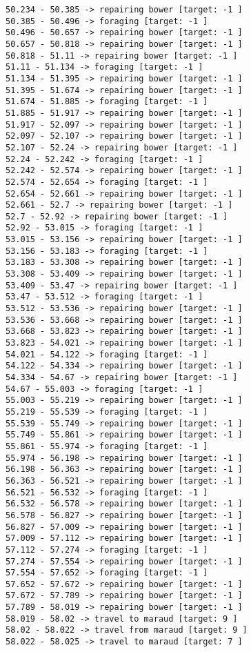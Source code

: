 \documentclass[11pt]{article}
\begin{document}
\begin{Verbatim}[commandchars=\\\{\}]
50.234 - 50.385 -> repairing bower [target: -1 ]
50.385 - 50.496 -> foraging [target: -1 ]
50.496 - 50.657 -> repairing bower [target: -1 ]
50.657 - 50.818 -> repairing bower [target: -1 ]
50.818 - 51.11 -> repairing bower [target: -1 ]
51.11 - 51.134 -> foraging [target: -1 ]
51.134 - 51.395 -> repairing bower [target: -1 ]
51.395 - 51.674 -> repairing bower [target: -1 ]
51.674 - 51.885 -> foraging [target: -1 ]
51.885 - 51.917 -> repairing bower [target: -1 ]
51.917 - 52.097 -> repairing bower [target: -1 ]
52.097 - 52.107 -> repairing bower [target: -1 ]
52.107 - 52.24 -> repairing bower [target: -1 ]
52.24 - 52.242 -> foraging [target: -1 ]
52.242 - 52.574 -> repairing bower [target: -1 ]
52.574 - 52.654 -> foraging [target: -1 ]
52.654 - 52.661 -> repairing bower [target: -1 ]
52.661 - 52.7 -> repairing bower [target: -1 ]
52.7 - 52.92 -> repairing bower [target: -1 ]
52.92 - 53.015 -> foraging [target: -1 ]
53.015 - 53.156 -> repairing bower [target: -1 ]
53.156 - 53.183 -> foraging [target: -1 ]
53.183 - 53.308 -> repairing bower [target: -1 ]
53.308 - 53.409 -> repairing bower [target: -1 ]
53.409 - 53.47 -> repairing bower [target: -1 ]
53.47 - 53.512 -> foraging [target: -1 ]
53.512 - 53.536 -> repairing bower [target: -1 ]
53.536 - 53.668 -> repairing bower [target: -1 ]
53.668 - 53.823 -> repairing bower [target: -1 ]
53.823 - 54.021 -> repairing bower [target: -1 ]
54.021 - 54.122 -> foraging [target: -1 ]
54.122 - 54.334 -> repairing bower [target: -1 ]
54.334 - 54.67 -> repairing bower [target: -1 ]
54.67 - 55.003 -> foraging [target: -1 ]
55.003 - 55.219 -> repairing bower [target: -1 ]
55.219 - 55.539 -> foraging [target: -1 ]
55.539 - 55.749 -> repairing bower [target: -1 ]
55.749 - 55.861 -> repairing bower [target: -1 ]
55.861 - 55.974 -> foraging [target: -1 ]
55.974 - 56.198 -> repairing bower [target: -1 ]
56.198 - 56.363 -> repairing bower [target: -1 ]
56.363 - 56.521 -> repairing bower [target: -1 ]
56.521 - 56.532 -> foraging [target: -1 ]
56.532 - 56.578 -> repairing bower [target: -1 ]
56.578 - 56.827 -> repairing bower [target: -1 ]
56.827 - 57.009 -> repairing bower [target: -1 ]
57.009 - 57.112 -> repairing bower [target: -1 ]
57.112 - 57.274 -> foraging [target: -1 ]
57.274 - 57.554 -> repairing bower [target: -1 ]
57.554 - 57.652 -> foraging [target: -1 ]
57.652 - 57.672 -> repairing bower [target: -1 ]
57.672 - 57.789 -> repairing bower [target: -1 ]
57.789 - 58.019 -> repairing bower [target: -1 ]
58.019 - 58.02 -> travel to maraud [target: 9 ]
58.02 - 58.022 -> travel from maraud [target: 9 ]
58.022 - 58.025 -> travel to maraud [target: 7 ]

\end{Verbatim}
\end{document}

